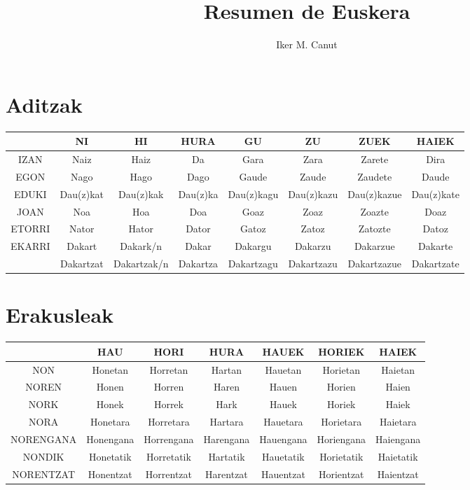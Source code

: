 \documentclass[12pt, a4paper, landscape]{article}
\begin{document}
\author{Iker M. Canut}
\title{Resumen de Euskera}
\maketitle
\newpage

\tableofcontents
\newpage

\section{Aditzak}
\begin{table}[h]
\begin{center}
\begin{tabular}{|c|c|c|c|c|c|c|c|}
\hline
& NI & HI & HURA & GU & ZU & ZUEK & HAIEK \\
\hline
IZAN & Naiz & Haiz & Da & Gara & Zara & Zarete & Dira \\
\hline
EGON & Nago & Hago & Dago & Gaude & Zaude & Zaudete & Daude \\
\hline
EDUKI & Dau(z)kat & Dau(z)kak & Dau(z)ka & Dau(z)kagu & Dau(z)kazu & Dau(z)kazue & Dau(z)kate \\
\hline
JOAN & Noa & Hoa & Doa & Goaz & Zoaz & Zoazte & Doaz \\
\hline
ETORRI & Nator & Hator & Dator & Gatoz & Zatoz & Zatozte & Datoz \\
\hline
\multirow{2}{*}{EKARRI} & Dakart & Dakark/n & Dakar & Dakargu & Dakarzu & Dakarzue & Dakarte \\ & Dakartzat & Dakartzak/n & Dakartza & Dakartzagu & Dakartzazu & Dakartzazue & Dakartzate \\
\hline
\end{tabular}
\end{center}
\end{table}
\newpage

\section{Erakusleak}
\begin{table}[h]
\begin{center}
\begin{tabular}{|c|c|c|c|c|c|c|}
\hline
& HAU & HORI & HURA & HAUEK & HORIEK & HAIEK \\
\hline
NON & Honetan & Horretan & Hartan & Hauetan & Horietan & Haietan \\
\hline
NOREN & Honen & Horren & Haren & Hauen & Horien & Haien \\
\hline
NORK & Honek & Horrek & Hark & Hauek & Horiek & Haiek \\
\hline
NORA & Honetara & Horretara & Hartara & Hauetara & Horietara & Haietara \\ 
\hline
NORENGANA & Honengana & Horrengana & Harengana & Hauengana & Horiengana & Haiengana \\
\hline
NONDIK & Honetatik & Horretatik & Hartatik & Hauetatik & Horietatik & Haietatik \\
\hline
NORENTZAT & Honentzat & Horrentzat & Harentzat & Hauentzat & Horientzat & Haientzat \\
\hline
\end{tabular}
\end{center}
\end{table}
\newpage
\end{document}

